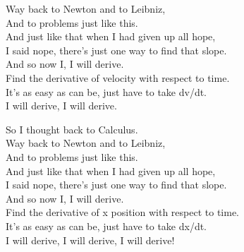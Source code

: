 Way back to Newton and to Leibniz,\\
And to problems just like this.\\
And just like that when I had given up all hope,\\
I said nope, there's just one way to find that slope.\\
And so now I, I will derive.\\
Find the derivative of velocity with respect to time.\\
It's as easy as can be, just have to take dv/dt.\\
I will derive, I will derive.\par
\vspace{10pt}
So I thought back to Calculus.\\
Way back to Newton and to Leibniz,\\
And to problems just like this.\\
And just like that when I had given up all hope,\\
I said nope, there's just one way to find that slope.\\
And so now I, I will derive.\\
Find the derivative of x position with respect to time.\\
It's as easy as can be, just have to take dx/dt.\\
I will derive, I will derive, I will derive!
